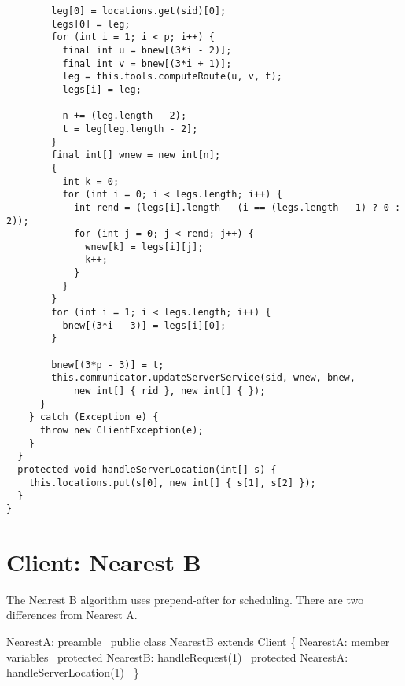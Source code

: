 {\begin{verbatim}
        leg[0] = locations.get(sid)[0];
        legs[0] = leg;
        for (int i = 1; i < p; i++) {
          final int u = bnew[(3*i - 2)];
          final int v = bnew[(3*i + 1)];
          leg = this.tools.computeRoute(u, v, t);
          legs[i] = leg;

          n += (leg.length - 2);
          t = leg[leg.length - 2];
        }
        final int[] wnew = new int[n];
        {
          int k = 0;
          for (int i = 0; i < legs.length; i++) {
            int rend = (legs[i].length - (i == (legs.length - 1) ? 0 : 2));
            for (int j = 0; j < rend; j++) {
              wnew[k] = legs[i][j];
              k++;
            }
          }
        }
        for (int i = 1; i < legs.length; i++) {
          bnew[(3*i - 3)] = legs[i][0];
        }

        bnew[(3*p - 3)] = t;
        this.communicator.updateServerService(sid, wnew, bnew,
            new int[] { rid }, new int[] { });
      }
    } catch (Exception e) {
      throw new ClientException(e);
    }
  }
  protected void handleServerLocation(int[] s) {
    this.locations.put(s[0], new int[] { s[1], s[2] });
  }
}
\end{verbatim}
}

\nwenddocs{}\chapter{Client: Nearest B}
\label{client-nearest-b}

The Nearest B algorithm uses prepend-after for scheduling. There are two
differences from Nearest A.

\nwenddocs{}\endmoddef\nwstartdeflinemarkup\nwenddeflinemarkup
\LA{}NearestA: preamble~{\nwtagstyle{}}\RA{}
public class NearestB extends Client \{
  \LA{}NearestA: member variables~{\nwtagstyle{}}\RA{}
  protected \LA{}NearestB: handleRequest(1)~{\nwtagstyle{}}\RA{}
  protected \LA{}NearestA: handleServerLocation(1)~{\nwtagstyle{}}\RA{}
\}
\nwendcode{}\nwdocspar

